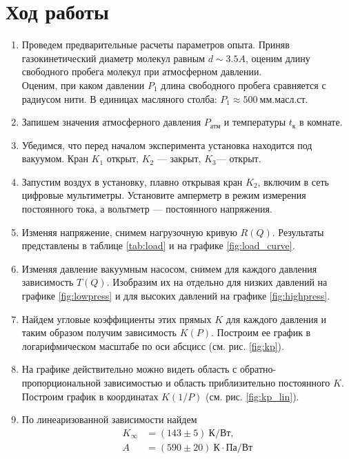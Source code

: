 \documentclass[12pt]{article}
\begin{document}
    \section{Ход работы}
        \begin{enumerate}
            \item Проведем предварительные расчеты параметров опыта. Приняв газокинетический диаметр молекул равным $d \sim 3.5 A$, оценим
            длину свободного пробега молекул при атмосферном давлении.\\
            Оценим, при каком давлении $P_1$ длина свободного пробега сравняется с радиусом нити. В единицах масляного столба: $P_1 \approx 500\ \text{мм.масл.ст.}$
            \item Запишем значения атмосферного давления $P_{\text{атм}}$ и температуры $t_{\text{к}}$ в комнате.
            \item Убедимся, что перед началом эксперимента установка находится под вакуумом. Кран $K_1$ открыт, $K_2$ — закрыт, $K_3$— открыт.
            \item Запустим воздух в установку, плавно открывая кран $K_2$, включим в сеть цифровые мультиметры. Установите амперметр в режим
            измерения постоянного тока, а вольтметр — постоянного напряжения.
            \item Изменяя напряжение, снимем нагрузочную кривую $R(Q)$. Результаты представлены в
            таблице \ref{tab:load} и на графике \ref{fig:load_curve}.

            \item Изменяя давление вакуумным насосом, снимем для каждого давления
            зависимость $T(Q)$. Изобразим их на отдельно для низких давлений на графике \ref{fig:lowpress}
            и для высоких давлений на графике \ref{fig:highpress}.

            \item Найдем угловые коэффициенты этих прямых $K$ для каждого давления
            и таким образом получим зависимость $K(P)$. Построим ее график в логарифмическом масштабе
            по оси абсцисс (см. рис. \ref{fig:kp}).

            \item На графике действительно можно видеть область с обратно-пропорциональной зависимостью и
            область приблизительно постоянного $K$. Построим график в координатах $K(1/P)$ (см. рис. \ref{fig:kp_lin}).

            \item По линеаризованной зависимости найдем
            \begin{align*}
            K_{\infty} & = (143\pm 5)\ \text{К}/\text{Вт},\\
            A & = (590\pm 20)\ \text{К}\cdot \text{Па}/\text{Вт}
            \end{align*}


\end{enumerate}
\end{document}
